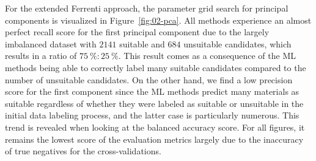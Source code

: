 \documentclass[superscriptaddress,unsortedaddress,
 amsmath,amssymb,
 aps,
]{revtex4-2}
\begin{document}
For the extended Ferrenti approach, the parameter grid search for principal components is visualized in Figure~\ref{fig:02-pca}. All methods experience an almost perfect recall score for the first principal component due to the largely imbalanced dataset with $2141$ suitable and $684$ unsuitable candidates, which results in  a ratio of $75 \ \% : 25 \ \%$. This result comes as a consequence of the ML methods being able to correctly label many suitable candidates compared to the number of unsuitable candidates. 
On the other hand, we find a low precision score for the first component since the ML methods  predict many materials as suitable regardless of whether they were labeled as suitable or unsuitable in the initial data labeling process, and the latter case is particularly numerous. 
This trend is revealed when looking at the balanced accuracy score. For all figures, it remains the lowest score of the evaluation metrics largely due to the inaccuracy of true negatives for the cross-validations.  

\begin{table}[t]
\centering
\caption{Optimal number of principal components and the respective scores (standard deviation) for each of the four ML methods logistic regression (LOG), decision trees (DT), random forests (RF) and gradient boosting (GB) in the extended Ferrenti approach, as visualized by the dash-dotted line in Fig.~\ref{fig:02-pca}.}
\label{tab:02-pc}
\noindent{}
\end{table}
\end{document}
